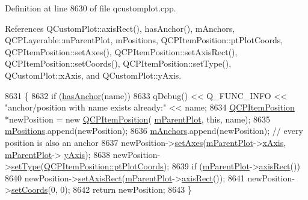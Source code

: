 Definition at line 8630 of file qcustomplot.\+cpp.



References Q\+Custom\+Plot\+::axis\+Rect(), has\+Anchor(), m\+Anchors, Q\+C\+P\+Layerable\+::m\+Parent\+Plot, m\+Positions, Q\+C\+P\+Item\+Position\+::pt\+Plot\+Coords, Q\+C\+P\+Item\+Position\+::set\+Axes(), Q\+C\+P\+Item\+Position\+::set\+Axis\+Rect(), Q\+C\+P\+Item\+Position\+::set\+Coords(), Q\+C\+P\+Item\+Position\+::set\+Type(), Q\+Custom\+Plot\+::x\+Axis, and Q\+Custom\+Plot\+::y\+Axis.


\begin{DoxyCode}
8631 \{
8632   \textcolor{keywordflow}{if} (\hyperlink{class_q_c_p_abstract_item_acbce9e5ba5252541d19db0c40303357a}{hasAnchor}(name))
8633     qDebug() << Q\_FUNC\_INFO << \textcolor{stringliteral}{"anchor/position with name exists already:"} << name;
8634   \hyperlink{class_q_c_p_item_position}{QCPItemPosition} *newPosition = \textcolor{keyword}{new} \hyperlink{class_q_c_p_item_position}{QCPItemPosition}(
      \hyperlink{class_q_c_p_layerable_aa2a528433e44db02b8aef23c1f9f90ed}{mParentPlot}, \textcolor{keyword}{this}, name);
8635   \hyperlink{class_q_c_p_abstract_item_af94ff71b6a15ea6d028ab8bd8eccd012}{mPositions}.append(newPosition);
8636   \hyperlink{class_q_c_p_abstract_item_a909a3abab783de302ebf0a0e6f2bbc15}{mAnchors}.append(newPosition); \textcolor{comment}{// every position is also an anchor}
8637   newPosition->\hyperlink{class_q_c_p_item_position_a2185f45c75ac8cb9be89daeaaad50e37}{setAxes}(\hyperlink{class_q_c_p_layerable_aa2a528433e44db02b8aef23c1f9f90ed}{mParentPlot}->\hyperlink{class_q_custom_plot_a9a79cd0158a4c7f30cbc702f0fd800e4}{xAxis}, \hyperlink{class_q_c_p_layerable_aa2a528433e44db02b8aef23c1f9f90ed}{mParentPlot}->
      \hyperlink{class_q_custom_plot_af6fea5679725b152c14facd920b19367}{yAxis});
8638   newPosition->\hyperlink{class_q_c_p_item_position_aa476abf71ed8fa4c537457ebb1a754ad}{setType}(\hyperlink{class_q_c_p_item_position_aad9936c22bf43e3d358552f6e86dbdc8ad5ffb8dc99ad73263f7010c77342294c}{QCPItemPosition::ptPlotCoords});
8639   \textcolor{keywordflow}{if} (\hyperlink{class_q_c_p_layerable_aa2a528433e44db02b8aef23c1f9f90ed}{mParentPlot}->\hyperlink{class_q_custom_plot_a4a37a1add5fe63060ac518cf0a4c4050}{axisRect}())
8640     newPosition->\hyperlink{class_q_c_p_item_position_a0cd9b326fb324710169e92e8ca0041c2}{setAxisRect}(\hyperlink{class_q_c_p_layerable_aa2a528433e44db02b8aef23c1f9f90ed}{mParentPlot}->\hyperlink{class_q_custom_plot_a4a37a1add5fe63060ac518cf0a4c4050}{axisRect}());
8641   newPosition->\hyperlink{class_q_c_p_item_position_aa988ba4e87ab684c9021017dcaba945f}{setCoords}(0, 0);
8642   \textcolor{keywordflow}{return} newPosition;
8643 \}
\end{DoxyCode}


